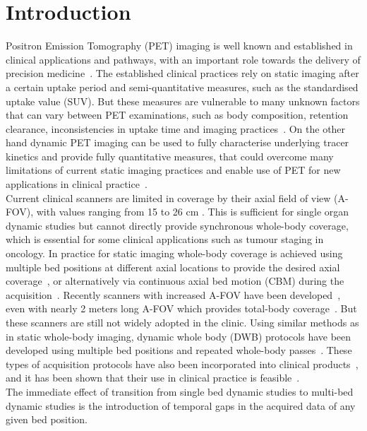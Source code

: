 \section*{Introduction}
Positron Emission Tomography (PET) imaging is well known and established in clinical applications and pathways, with an important role towards the delivery of precision medicine~\cite{Subramaniam2017}. The established clinical practices rely on static imaging after a certain uptake period and semi-quantitative measures, such as the standardised uptake value (SUV). But these measures are vulnerable to many unknown factors that can vary between PET examinations, such as body composition, retention clearance, inconsistencies in uptake time and imaging practices~\cite{Boellaard2011}. On the other hand dynamic PET imaging can be used to fully characterise underlying tracer kinetics and provide fully quantitative measures, that could overcome many limitations of current static imaging practices and enable use of PET for new applications in clinical practice~\cite{Lammertsma2017,Dimitrakopoulou2021,Meikle2021}. \\
Current clinical scanners are limited in coverage by their axial field of view (A-FOV), with values ranging from 15 to 26 cm \cite{Vandenberghe2020}. This is sufficient for single organ dynamic studies but cannot directly provide synchronous whole-body coverage, which is essential for some clinical applications such as tumour staging in oncology. 
In practice for static imaging whole-body coverage is achieved using multiple bed positions at different axial locations to provide the desired axial coverage~\cite{Schubert1996}, or alternatively via continuous axial bed motion (CBM) during the acquisition~\cite{Panin2014}. 
Recently scanners with increased A-FOV have been developed~\cite{Karp2020,Siegel2020},
even with nearly 2 meters long A-FOV which provides total-body coverage~\cite{Cherry2018}. 
But these scanners are still not widely adopted in the clinic. 
Using similar methods as in static whole-body imaging, dynamic whole body (DWB) protocols have been developed using multiple bed positions and repeated whole-body passes~\cite {Karakatsanis2011,Karakatsanis2013,Rahmim2019}. These types of acquisition protocols have also been incorporated into clinical products~\cite{Hu2020}, and it has been shown that their use in clinical practice is feasible~\cite{Fahrni2019,Dias2020}. \\
The immediate effect of transition from single bed dynamic studies to multi-bed dynamic studies is the introduction of temporal gaps in the acquired data of any given bed position. 
